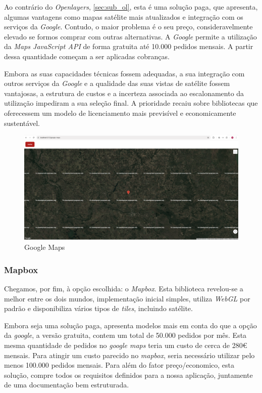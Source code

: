 Ao contrário do \textit{Openlayers}, \ref{sec:sub_ol}, esta é uma solução paga, que apresenta, algumas vantagens como mapas satélite mais atualizados e integração com os serviços da \textit{Google}. Contudo, o maior problema é o seu preço, consideravelmente elevado se formos comprar com outras alternativas. A \textit{Google} permite a utilização da {\textit{Maps JavaScript API}}\cite{google.maps.url} de forma gratuita até 10.000 pedidos mensais. A partir dessa quantidade começam a ser aplicadas cobranças.


Embora as suas capacidades técnicas fossem adequadas, a sua integração com outros serviços da \textit{Google} e a qualidade das suas vistas de satélite fossem vantajosas, a estrutura de custos e a incerteza associada ao escalonamento da utilização impediram a sua seleção final. A prioridade recaiu sobre bibliotecas que oferecessem um modelo de licenciamento mais previsível e economicamente sustentável.

\begin{figure}[!h]
		\centering
		\includegraphics[width=.7\textwidth]{figs/gm.png}
		\caption[Google maps]{Google Maps}
		\label{fig:gm}
\end{figure}

\clearpage
\subsubsection{\textbf{Mapbox}}\label{sec:mapbox} %
Chegamos, por fim, à opção escolhida: o \textit{Mapbox}. Esta biblioteca revelou-se a melhor entre os dois mundos, implementação inicial simples, utiliza \textit{WebGL} por padrão e disponibiliza vários tipos de \textit{tiles}, incluindo satélite. 

Embora seja uma solução paga, apresenta modelos mais em conta do que a opção da \textit{google}, a versão gratuita, contem um total de 50.000 pedidos por mês. Esta mesma quantidade de pedidos no \textit{google maps} teria um custo de cerca de 280€ mensais. Para atingir um custo parecido no \textit{mapbox}, seria necessário utilizar pelo menos 100.000 pedidos mensais. Para além do fator preço/economico, esta solução, compre todos os requisitos definidos para a nossa aplicação, juntamente de uma documentação bem estruturada.

